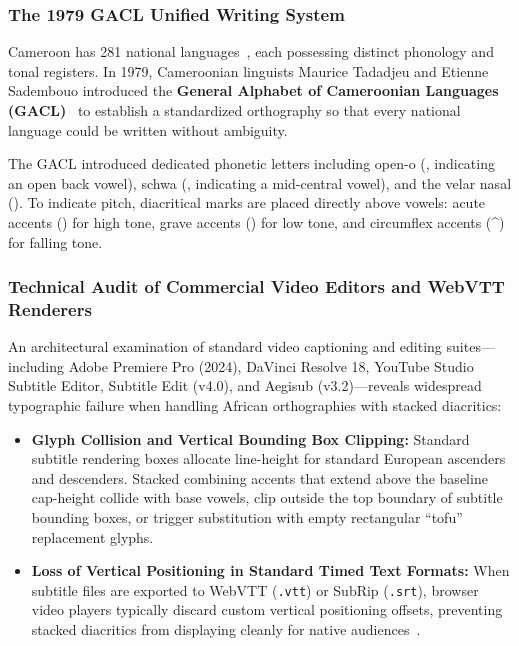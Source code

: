 \documentclass[a4paper,11pt]{article}
\begin{document}
\subsubsection{The 1979 GACL Unified Writing System}
\label{sec:chap2_gacl_system}
Cameroon has 281 national languages~\cite{eberhard2021ethnologue}, each possessing distinct phonology and tonal registers. In 1979, Cameroonian linguists Maurice Tadadjeu and Etienne Sadembouo introduced the \textbf{General Alphabet of Cameroonian Languages (GACL)}~\cite{tadadjeu1979alphabet} to establish a standardized orthography so that every national language could be written without ambiguity. 

The GACL introduced dedicated phonetic letters including open-o (\textopeno, indicating an open back vowel), schwa (\textschwa, indicating a mid-central vowel), and the velar nasal (\textipa{\ng}). To indicate pitch, diacritical marks are placed directly above vowels: acute accents (\textasciiacute) for high tone, grave accents (\textasciigrave) for low tone, and circumflex accents (\^{}) for falling tone.

\subsubsection{Technical Audit of Commercial Video Editors and WebVTT Renderers}
\label{sec:chap2_editor_break}
An architectural examination of standard video captioning and editing suites---including Adobe Premiere Pro (2024), DaVinci Resolve 18, YouTube Studio Subtitle Editor, Subtitle Edit (v4.0), and Aegisub (v3.2)---reveals widespread typographic failure when handling African orthographies with stacked diacritics:
\begin{itemize}
    \item \textbf{Glyph Collision and Vertical Bounding Box Clipping:} Standard subtitle rendering boxes allocate line-height for standard European ascenders and descenders. Stacked combining accents that extend above the baseline cap-height collide with base vowels, clip outside the top boundary of subtitle bounding boxes, or trigger substitution with empty rectangular ``tofu'' replacement glyphs.
    \item \textbf{Loss of Vertical Positioning in Standard Timed Text Formats:} When subtitle files are exported to WebVTT (\texttt{.vtt}) or SubRip (\texttt{.srt}), browser video players typically discard custom vertical positioning offsets, preventing stacked diacritics from displaying cleanly for native audiences~\cite{w3c2019webvtt}.
\end{itemize}
\end{document}
